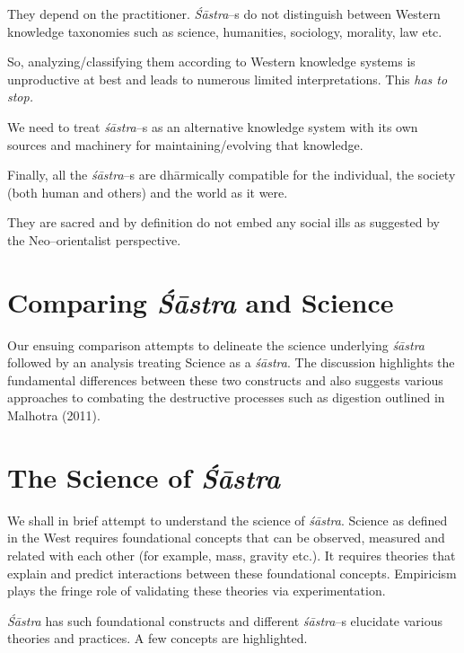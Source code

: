  \item They depend on the practitioner. \textit{Śāstra}–s do not distinguish between Western knowledge taxonomies such as science, humanities, sociology, morality, law etc.

 \item So, analyzing/classifying them according to Western knowledge systems is unproductive at best and leads to numerous limited interpretations. This \textit{has to stop.}

 \item We need to treat \textit{śāstra}–s as an alternative knowledge system with its own sources and machinery for maintaining/evolving that knowledge.

 \item Finally, all the \textit{śāstra}–s are dhārmically compatible for the individual, the society (both human and others) and the world as it were.

 \item They are sacred and by definition do not embed any social ills as suggested by the Neo–orientalist perspective.



\section*{Comparing \textit{Śāstra} and Science}

Our ensuing comparison attempts to delineate the science underlying \textit{śāstra} followed by an analysis treating Science as a \textit{śāstra}. The discussion highlights the fundamental differences between these two constructs and also suggests various approaches to combating the destructive processes such as digestion outlined in Malhotra (2011).


\section*{The Science of \textit{Śāstra}}

We shall in brief attempt to understand the science of \textit{śāstra}. Science as defined in the West requires foundational concepts that can be observed, measured and related with each other (for example, mass, gravity etc.). It requires theories that explain and predict interactions between these foundational concepts. Empiricism plays the fringe role of validating these theories via experimentation.

\textit{Śāstra} has such foundational constructs and different \textit{śāstra}–s elucidate various theories and practices. A few concepts are highlighted.

